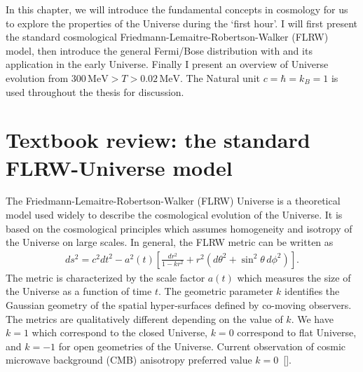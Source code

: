 In this chapter, we will introduce the fundamental concepts in cosmology for us to explore the properties of the Universe during the `first hour'. I will first present the standard cosmological Friedmann-Lemaitre-Robertson-Walker (FLRW) model, then introduce the general Fermi/Bose distribution with and its application in the early Universe. Finally I present an overview of Universe evolution from $300\,\mathrm{MeV}>T>0.02\,\mathrm{MeV}$.
The Natural unit $c=\hbar=k_{B}=1$ is used throughout the thesis for discussion.
\section{Textbook review: the standard FLRW-Universe model}
The Friedmann-Lemaitre-Robertson-Walker (FLRW) Universe is a theoretical model used widely to describe the cosmological evolution of the Universe. It is based on the cosmological principles which assumes homogeneity and isotropy of the Universe on large scales. In general, the FLRW metric can be written as
\begin{align}\label{metric}
ds^2=c^2dt^2-a^2(t)\left[ \frac{dr^2}{1-kr^2}+r^2(d\theta^2+\sin^2\theta\,d\phi^2)\right].
\end{align}
The metric is characterized by the scale factor $a(t)$ which measures the size of the Universe as a function of time $t$. The geometric parameter $k$ identifies the Gaussian geometry of the spatial hyper-surfaces defined by co-moving observers. The metrics are qualitatively different depending on the value of $k$. We have $k=1$ which correspond to the closed Universe,  $k=0$ correspond to flat Universe, and $k=-1$ for open geometries of the Universe. Current observation of cosmic microwave background (CMB) anisotropy preferred value $k=0$~[\cite{Planck:2013pxb,Planck:2015fie,Planck:2018vyg}].